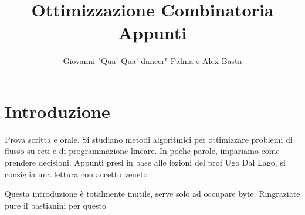 \documentclass{report}
\title{\Huge{Ottimizzazione Combinatoria}\\Appunti}
\author{\huge{Giovanni "Qua' Qua' dancer" Palma e Alex Basta}}
\date{}
\begin{document}
\maketitle
\newpage%
\tableofcontents

\pagebreak

\chapter{Introduzione}
Prova scritta e orale. Si studiano metodi algoritmici per ottimizzare problemi di flusso su reti e di programmazione lineare. In poche parole, impariamo come prendere decisioni.
Appunti presi in base alle lezioni del prof Ugo Dal Lago, si consiglia una lettura con accetto veneto

Questa introduzione è totalmente inutile, serve solo ad occupare byte. Ringraziate pure il bastianini per questo \faWhatsapp




\end{document}

